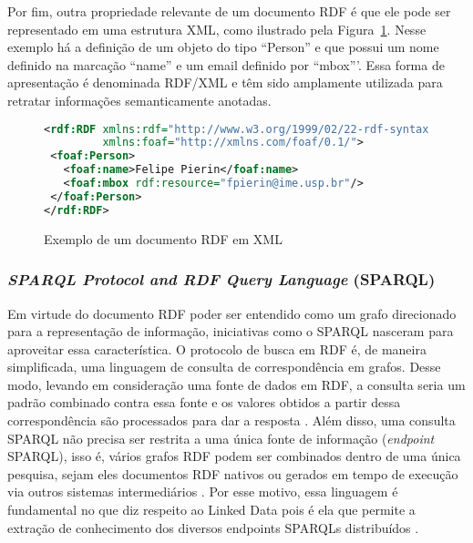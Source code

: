 Por fim, outra propriedade relevante de um documento RDF é que ele pode ser representado em uma estrutura XML, como ilustrado pela Figura~\ref{fig:exemplo_codigo_rdf}. Nesse exemplo há a definição de um objeto do tipo ``Person'' e que possui um nome definido na marcação ``name'' e um email definido por ``mbox'''. Essa forma de apresentação é denominada RDF/XML e têm sido amplamente utilizada para retratar informações semanticamente anotadas.

\begin{figure}[!ht]
    \begin{lstlisting}[language=XML]
<rdf:RDF xmlns:rdf="http://www.w3.org/1999/02/22-rdf-syntax-ns#"
         xmlns:foaf="http://xmlns.com/foaf/0.1/">
 <foaf:Person>
   <foaf:name>Felipe Pierin</foaf:name>
   <foaf:mbox rdf:resource="fpierin@ime.usp.br"/>
 </foaf:Person>
</rdf:RDF>
    \end{lstlisting}
    \caption{Exemplo de um documento RDF em XML}
    \label{fig:exemplo_codigo_rdf} 
\end{figure}

\subsubsection{\emph{SPARQL Protocol and RDF Query Language} (SPARQL)}
\label{sec:sparql}

Em virtude do documento RDF poder ser entendido como um grafo direcionado para a representação de informação, iniciativas como o SPARQL nasceram para aproveitar essa característica. O protocolo de busca em RDF é, de maneira simplificada, uma linguagem de consulta de correspondência em grafos. Desse modo, levando em consideração uma fonte de dados em RDF, a consulta seria um padrão combinado contra essa fonte e os valores obtidos a partir dessa correspondência são processados para dar a resposta \citep{Perez2006}. Além disso, uma consulta SPARQL não precisa ser restrita a uma única fonte de informação (\emph{endpoint} SPARQL), isso é, vários grafos RDF podem ser combinados dentro de uma única pesquisa, sejam eles documentos RDF nativos ou gerados em tempo de execução via outros sistemas intermediários \citep{W3C_SPARQL}. Por esse motivo, essa linguagem é fundamental no que diz respeito ao Linked Data pois é ela que permite a extração de conhecimento dos diversos endpoints SPARQLs distribuídos \citep{Singh2010}.

